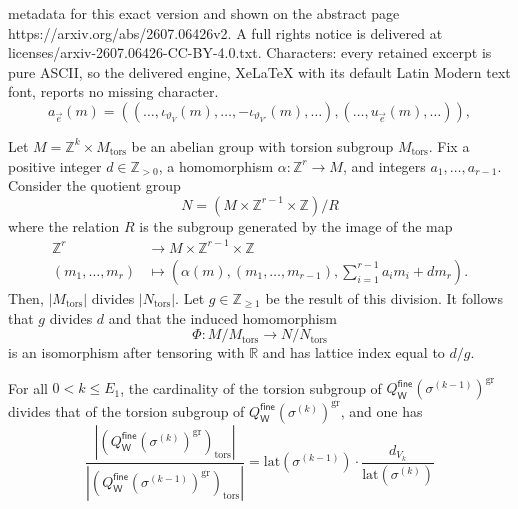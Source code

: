 \documentclass[10pt,a4paper]{amsart}
\newcommand{\W}{\mathsf{W}}
\def\Z{\mathbb{Z}}
\newcommand{\fine}{\mathsf{fine}}
\newcommand{\gr}{\mathrm{gr}}
\newcommand{\tors}{\mathrm{tors}}
\begin{document}
metadata for this exact version and shown on the abstract page https://arxiv.org/abs/2607.06426v2. A full rights notice is delivered at licenses/arxiv-2607.06426-CC-BY-4.0.txt. Characters: every retained excerpt is pure ASCII, so the delivered engine, XeLaTeX with its default Latin Modern text font, reports no missing character.
        \begin{equation}\label{eqn: relations from tropical curve}
        a_{\vec{e}}(m) = \left((\ldots, \iota_{\vartheta_V}(m), \ldots, -\iota_{\vartheta_{V'}}(m), \ldots), (\ldots, u_{\vec{e}}(m), \ldots)\right),
        \end{equation}

\begin{lemma} \label{lem: constrained}
    Let $M = \mathbb{Z}^k \times M_{\mathrm{tors}}$ be an abelian group with torsion subgroup $M_{\mathrm{tors}}$. Fix a positive integer $d \in \mathbb{Z}_{>0}$, a homomorphism $\alpha: \mathbb{Z}^r \to M$, and integers $a_1, \ldots, a_{r-1}$. Consider the quotient group
\begin{equation*}
    N = (M \times \mathbb{Z}^{r-1} \times \mathbb{Z}) / R
\end{equation*}
where the relation $R$ is the subgroup generated by the image of the map
\begin{align*}
    \mathbb{Z}^r & \to M \times \mathbb{Z}^{r-1} \times \mathbb{Z} \\
    (m_1, \ldots, m_r) & \mapsto \left(\alpha(m), (m_1, \ldots, m_{r-1}), \sum_{i=1}^{r-1} a_i m_i + d m_r\right).
\end{align*}
Then,  $|M_{\mathrm{tors}} |$ divides $ |N_{\mathrm{tors}}|$. Let $g \in \Z_{\geq 1}$ be the result of this division. It follows that $g$ divides $d$ and that the induced homomorphism
\begin{equation*}
    \Phi: M/M_{\mathrm{tors}} \to N/N_{\mathrm{tors}}
\end{equation*}
is an isomorphism after tensoring with $\mathbb{R}$ and has lattice index equal to $d/g$.
    
\end{lemma}

\begin{proposition}\label{prop: cycle induction}
    For all $0<k \leq E_1$, the cardinality of the torsion subgroup of $Q^\fine_\W(\sigma^{(k-1)})^{\gr}$ divides that of the torsion subgroup of $Q^\fine_\W(\sigma^{(k)})^{\gr}$, and one has 
    $$  \frac{|(Q^\fine_\W(\sigma^{(k)})^{\gr})_{\tors}|}{|(Q^\fine_\W(\sigma^{(k-1)})^{\gr})_{\tors}|} = \mathrm{lat}(\sigma^{(k-1)})  \cdot \frac{ d_{V_k}}{\mathrm{lat}(\sigma^{(k)})}
    $$  
\end{proposition}
\end{document}

